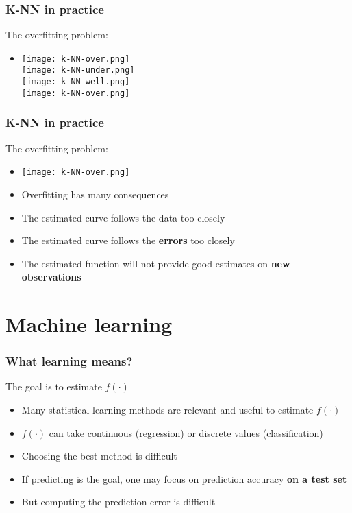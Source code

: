 \documentclass[xcolor=x11names,compress, aspectratio=169]{beamer}
\renewcommand{\(}{\begin{columns}}
\renewcommand{\)}{\end{columns}}
\newcommand{\<}[1]{\begin{column}{#1}}
\renewcommand{\>}{\end{column}}
\begin{document}
\begin{frame}
\frametitle{\textcolor{brique}{ K-NN in practice}}
The overfitting problem: 
\begin{itemize}
\item[] 
    {\texttt{[image: k-NN-over.png]} \\ }
    {\texttt{[image: k-NN-under.png]} \\ }
    {\texttt{[image: k-NN-well.png]} \\ }
    {\texttt{[image: k-NN-over.png]} \\ }  
\end{itemize}
\end{frame}


\begin{frame}
\frametitle{\textcolor{brique}{ K-NN in practice}}
The overfitting problem:
\begin{itemize}[<+->]
\item[] \texttt{[image: k-NN-over.png]} 
\item[] Overfitting has many consequences
\item The estimated curve follows the data too closely
\item The estimated curve follows the \textbf{errors} too closely
\item The estimated function will not provide good estimates on \textbf{new observations}
\end{itemize}
\end{frame}




\section{Machine learning}


\begin{frame}
\frametitle{\textcolor{brique}{ What learning means?}}
The goal is to estimate $f(\cdot)$
\begin{itemize}[<+->]
\item Many statistical learning methods are relevant and useful to estimate $f(\cdot)$
\item $f(\cdot)$ can take continuous (regression) or discrete values (classification)
\item Choosing the best method is difficult
\item If predicting is the goal, one may focus on prediction accuracy \textbf{on a test set}
\item But computing the prediction error is difficult
\end{itemize}
\end{frame}
\end{document}
